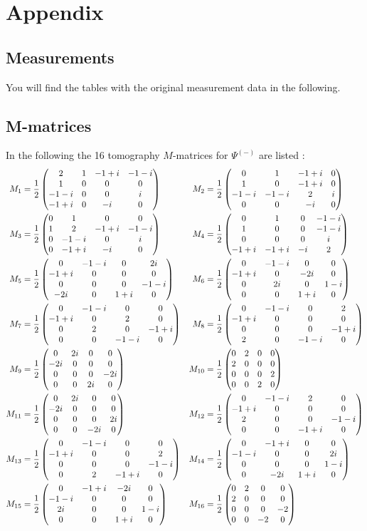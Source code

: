 \section{Appendix}
\subsection{Measurements}
You will find the tables with the original measurement data in the following.

\begin{table}[htbp]
\centering
\caption{
    Measurements for $\Psi^{+}$.
    The angles $\alpha$ and $\beta$ are the angles at the two polarizers.
    The coincidence count rates $C(\alpha,\beta)$ are taken five times as average over \SI{10}{\second} in order to reduce noise.
}
\label{tab:mesplus}
\bigtableplus
\end{table}

\begin{table}[htbp]
\centering
\caption{
    Measurements for $\Psi^{-}$.
    The angles $\alpha$ and $\beta$ are the angles at the two polarizers.
    The coincidence count rates $C(\alpha,\beta)$ are taken five times as average over \SI{10}{\second} in order to reduce noise.
}
\label{tab:mesminus}
\bigtableminus
\end{table}

\begin{table}[htbp]
\centering
\caption{
    Measurements for the tomography.
    The states S1 and S2 of photon 1 and 2 are choosen to provide the calculation of the density matrix of the light.
    The angles of the polarizers P1 and P2 and the $\lambda/4$ plates L1 and L2 for photon 1 and 2 must be choosen as mentioned.
    The coincidence count rates $C(\alpha,\beta)$ are taken five times as average over \SI{10}{\second} in order to reduce noise.
}
\label{tab:mestom}
\bigtabletom
\end{table}

\FloatBarrier
\subsection{M-matrices}\label{sec:Mmat}
In the following the 16 tomography $M$-matrices for $\Psi^{(-)}$ are listed \cite{barz}:
\begin{align*}
M_1
    &=\Ma
    &M_2
    &=\Mb
    \\
M_3
    &=\Mc
    &M_4
    &=\Md
    \\
M_5
    &=\Me
    &M_6
    &=\Mf
    \\
M_7
    &=\Mg
    &M_8
    &=\Mh
    \\
M_9
    &=\Mi
    &M_{10}
    &=\Mj
    \\
M_{11}
    &=\Mk
    &M_{12}
    &=\Ml
    \\
M_{13}
    &=\Mm
    &M_{14}
    &=\Mn
    \\
M_{15}
    &=\Mo
    &M_{16}
    &=\Mp
\end{align*}